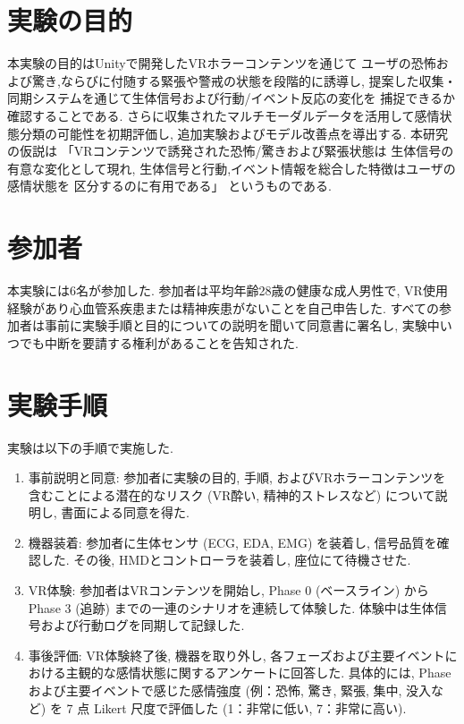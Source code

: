 \documentclass[book,paper=a4,fontsize=10pt,jafontscale=0.92]{jlreq}
\begin{document}
\section{実験の目的}

本実験の目的はUnityで開発したVRホラーコンテンツを通じて
ユーザの恐怖および驚き,ならびに付随する緊張や警戒の状態を段階的に誘導し,
提案した収集・同期システムを通じて生体信号および行動/イベント反応の変化を
捕捉できるか確認することである.
さらに収集されたマルチモーダルデータを活用して感情状態分類の可能性を初期評価し,
追加実験およびモデル改善点を導出する.
本研究の仮説は 「VRコンテンツで誘発された恐怖/驚きおよび緊張状態は
生体信号の有意な変化として現れ,
生体信号と行動,イベント情報を総合した特徴はユーザの感情状態を
区分するのに有用である」 というものである.

\section{参加者}

本実験には6名が参加した.
参加者は平均年齢28歳の健康な成人男性で,
VR使用経験があり心血管系疾患または精神疾患がないことを自己申告した.
すべての参加者は事前に実験手順と目的についての説明を聞いて同意書に署名し,
実験中いつでも中断を要請する権利があることを告知された.

\section{実験手順}
実験は以下の手順で実施した.
\begin{enumerate}
\item {事前説明と同意}: 参加者に実験の目的, 手順, およびVRホラーコンテンツを含むことによる潜在的なリスク (VR酔い, 精神的ストレスなど) について説明し, 書面による同意を得た.
\item {機器装着}: 参加者に生体センサ (ECG, EDA, EMG) を装着し, 信号品質を確認した. その後, HMDとコントローラを装着し, 座位にて待機させた.
\item {VR体験}: 参加者はVRコンテンツを開始し, Phase 0 (ベースライン) からPhase 3 (追跡) までの一連のシナリオを連続して体験した. 体験中は生体信号および行動ログを同期して記録した.
\item {事後評価}: VR体験終了後, 機器を取り外し, 各フェーズおよび主要イベントにおける主観的な感情状態に関するアンケートに回答した. 具体的には, Phase および主要イベントで感じた感情強度 (例：恐怖, 驚き, 緊張, 集中, 没入など) を 7 点 Likert 尺度で評価した (1：非常に低い, 7：非常に高い).
\end{enumerate}
\end{document}
